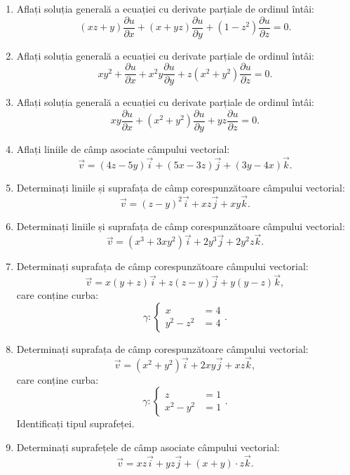 \begin{enumerate}
\item Aflați soluția generală a ecuației cu derivate parțiale de
  ordinul întâi:
  \[
    (xz + y) \dfrac{\partial u}{\partial x} + (x + yz) \dfrac{\partial u}{\partial y} + %
    (1 - z^2) \dfrac{\partial u}{\partial z} = 0.
  \]

\item Aflați soluția generală a ecuației cu derivate parțiale de
  ordinul întâi:
  \[
    xy^2 + \dfrac{\partial u}{\partial x} + x^2 y \dfrac{\partial u}{\partial y} + %
    z(x^2 + y^2) \dfrac{\partial u}{\partial z} = 0.
  \]

\item Aflați soluția generală a ecuației cu derivate parțiale de
  ordinul întâi:
  \[
    xy \dfrac{\partial u}{\partial x} + (x^2 + y^2) \dfrac{\partial u}{\partial y} + %
    yz \dfrac{\partial u}{\partial z} = 0.
  \]

\item Aflați liniile de câmp asociate câmpului vectorial:
  \[
    \vec{v} = (4z - 5y) \vec{i} + (5x - 3z)\vec{j} + (3y - 4x) \vec{k}.
  \]

\item Determinați liniile și suprafața de câmp corespunzătoare
  câmpului vectorial:
  \[
    \vec{v} = (z - y)^2 \vec{i} + xz \vec{j} + xy \vec{k}.
  \]

\item Determinați liniile și suprafața de câmp corespunzătoare
  câmpului vectorial:
  \[
    \vec{v} = (x^3 + 3xy^2) \vec{i} + 2y^3 \vec{j} + 2y^2z \vec{k}.
  \]

\item Determinați suprafața de câmp corespunzătoare câmpului vectorial:
  \[
    \vec{v} = x(y + z) \vec{i} + z(z - y) \vec{j} + y(y - z) \vec{k},
  \]
  care conține curba:
  \[
    \gamma : \begin{cases}
      x &= 4 \\
      y^2 - z^2 &= 4
    \end{cases}.
  \]

\item Determinați suprafața de câmp corespunzătoare câmpului vectorial:
  \[
    \vec{v} = (x^2 + y^2) \vec{i} + 2xy \vec{j} + xz \vec{k},
  \]
  care conține curba:
  \[
    \gamma: \begin{cases}
      z &= 1 \\
      x^2 - y^2 &= 1 
    \end{cases}.
  \]
  Identificați tipul suprafeței.

\item Determinați suprafețele de câmp asociate câmpului vectorial:
  \[
    \vec{v} = xz \vec{i} + yz \vec{j} + (x + y) \cdot z \vec{k}.
  \]


\end{enumerate}
